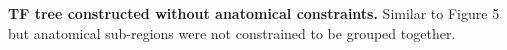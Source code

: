 \textbf{TF tree constructed without anatomical constraints.} 
Similar to Figure 5 but anatomical sub-regions were not constrained to be grouped together.

